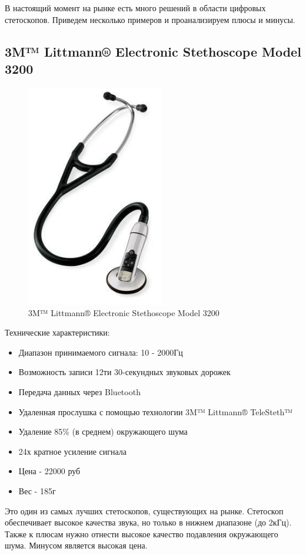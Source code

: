\documentclass[../paper.tex]{subfiles}
\begin{document}
В настоящий момент на рынке есть много решений в области цифровых стетоскопов. Приведем несколько примеров и проанализируем плюсы и минусы.

\subsection{3M™ Littmann® Electronic Stethoscope Model 3200}
\begin{figure}[H]
\centering
\includegraphics[width=6cm]{images/littmann.jpg}
\caption{3M™ Littmann® Electronic Stethoscope Model 3200}
\end{figure}

Технические характеристики:\cite{littmann}
\begin{itemize}
  \item Диапазон принимаемого сигнала: 10 - 2000Гц
  \item Возможность записи 12ти 30-секундных звуковых дорожек
  \item Передача данных через Bluetooth
  \item Удаленная прослушка с помощью технологии 3M™ Littmann® TeleSteth™
  \item Удаление 85\% (в среднем) окружающего шума
  \item 24х кратное усиление сигнала
  \item Цена - 22000 руб
  \item Вес - 185г
\end{itemize}

Это один из самых лучших стетоскопов, существующих на рынке. Стетоскоп обеспечивает высокое качества звука, но только в нижнем диапазоне (до 2кГц). Также к плюсам нужно отнести высокое качество подавления окружающего шума. Минусом является высокая цена.
\end{document}
